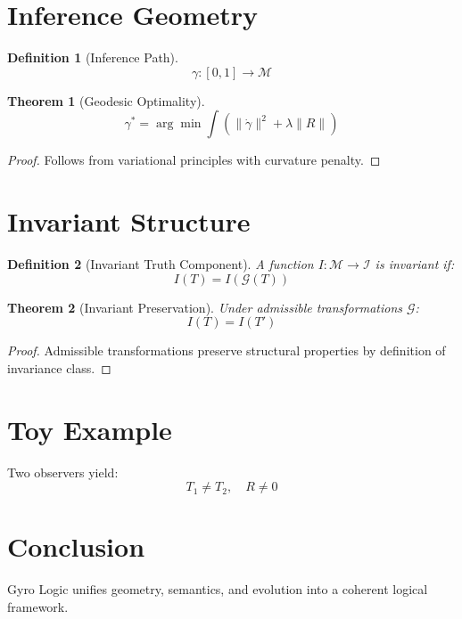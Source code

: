 \documentclass[11pt]{article}
\newtheorem{definition}{Definition}
\newtheorem{theorem}{Theorem}
\begin{document}
\section{Inference Geometry}

\begin{definition}[Inference Path]
\[
\gamma : [0,1] \to \mathcal{M}
\]
\end{definition}

\begin{theorem}[Geodesic Optimality]
\[
\gamma^* = \arg\min \int (\|\dot{\gamma}\|^2 + \lambda \|R\|)
\]
\end{theorem}

\begin{proof}
Follows from variational principles with curvature penalty.
\end{proof}

\section{Invariant Structure}

\begin{definition}[Invariant Truth Component]
A function $I: \mathcal{M} \to \mathcal{I}$ is invariant if:
\[
I(T) = I(\mathcal{G}(T))
\]
\end{definition}

\begin{theorem}[Invariant Preservation]
Under admissible transformations $\mathcal{G}$:
\[
I(T) = I(T')
\]
\end{theorem}

\begin{proof}
Admissible transformations preserve structural properties by definition of invariance class.
\end{proof}

\section{Toy Example}

Two observers yield:
\[
T_1 \neq T_2, \quad R \neq 0
\]

\section{Conclusion}

Gyro Logic unifies geometry, semantics, and evolution into a coherent logical framework.
\end{document}
